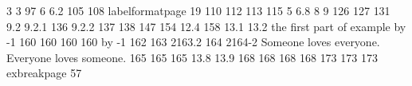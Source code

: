 \relax 
{} {{3}} 
 {{{}}{{3}}}
 {{97}} 
 {{6}} 
 {{6.2}} 
 {{105}} 
 {{108}} 
\@fd@f labelformatpage {{19}}
 {{110}} 
 {{112}} 
 {{113}} 
 {{115}} 
 {{\unhcopy \exnobox }} 
 {{5}} 
 {{6.8}} 
 {{8}} 
 {{9}} 
 {{126}} 
 {{127}} 
 {{131}} 
 {{9.2}} 
 {{9.2.1}} 
 {{136}} 
 {{9.2.2}} 
 {{137}} 
 {{138}} 
 {{147}} 
 {{154}} 
 {{12.4}} 
 {{158}} 
 {{13.1}} 
 {{13.2}} 
 {{the first part of example {\advance \excnt by -1 160}}} 
 {{160}}
 {{{}}{{160}}}
 {{{}}{{160}}}
 {{{\advance \excnt by -1 162}{\it {}}}} 
 {{163}} 
 {{{2}}{{163.2}}}
 {{164}} 
 {{{2}}{{164-2}}}
 {{Someone loves everyone.}} 
 {{Everyone loves someone.}} 
 {{165}} 
 {{{}}{{165}}}
 {{{}}{{165}}}
 {{13.8}} 
 {{13.9}} 
 {{168}}
 {{{}}{{168}}}
 {{{}}{{168}}}
 {{{}}{{168}}}
 {{173}} 
 {{{}}{{173}}}
 {{{}}{{173}}}
\@fd@f exbreakpage {{57}}
